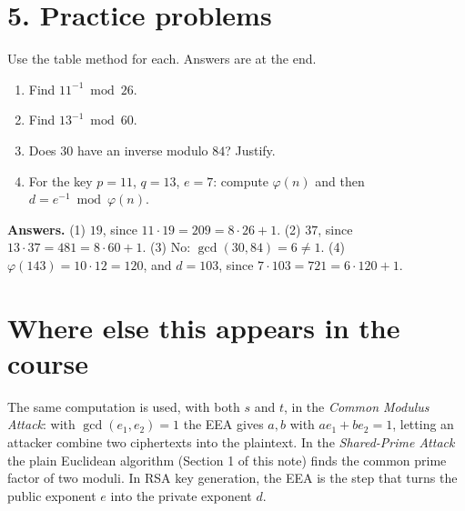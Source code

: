 \documentclass[11pt]{article}
\begin{document}
\section*{5. Practice problems}

Use the table method for each. Answers are at the end.
\begin{enumerate}[nosep]
\item Find $11^{-1}\bmod 26$.
\item Find $13^{-1}\bmod 60$.
\item Does $30$ have an inverse modulo $84$? Justify.
\item For the key $p=11$, $q=13$, $e=7$: compute $\varphi(n)$ and then $d=e^{-1}\bmod\varphi(n)$.
\end{enumerate}

\textbf{Answers.} (1) $19$, since $11\cdot19=209=8\cdot26+1$. (2) $37$, since $13\cdot37=481=8\cdot60+1$. (3) No: $\gcd(30,84)=6\ne1$. (4) $\varphi(143)=10\cdot12=120$, and $d=103$, since $7\cdot103=721=6\cdot120+1$.

\hrulefill

\section*{Where else this appears in the course}
The same computation is used, with both $s$ and $t$, in the \emph{Common Modulus Attack}: with $\gcd(e_1,e_2)=1$ the EEA gives $a,b$ with $ae_1+be_2=1$, letting an attacker combine two ciphertexts into the plaintext. In the \emph{Shared-Prime Attack} the plain Euclidean algorithm (Section 1 of this note) finds the common prime factor of two moduli. In RSA key generation, the EEA is the step that turns the public exponent $e$ into the private exponent $d$.
\end{document}
